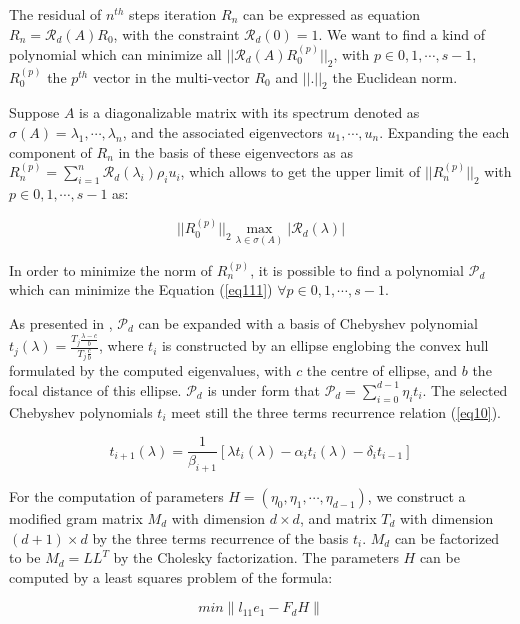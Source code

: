 The residual of \(n^{th}\) steps iteration \(R_n\) can be expressed as equation $R_n=\mathcal{R}_d(A)R_0$, with the constraint \(\mathcal{R}_d(0)=1\). We want to find a kind of polynomial which can minimize all \(||\mathcal{R}_d(A)R_0^{(p)}||_2\), with $p \in 0,1,\cdots,s-1$, $R_0^{(p)}$ the $p^{th}$ vector in the multi-vector $R_0$ and \(||.||_2\) the Euclidean norm.

Suppose $A$ is a diagonalizable matrix with its spectrum denoted as \(\sigma(A)=\lambda_1, \cdots, \lambda_n\), and the associated eigenvectors \(u_1, \cdots, u_n\). Expanding the each component of \(R_n\) in the basis of these eigenvectors as as $R_n^{(p)}=\sum_{i=1}^{n}\mathcal{R}_d(\lambda_i)\rho_i u_i$, which allows to get the upper limit of $||R_n^{(p)}||_2$ with $p \in 0,1,\cdots,s-1$ as:

\begin{equation}
\label{eq111}
||R_0^{(p)}||_2 \max_{\lambda \in \sigma(A)}|\mathcal{R}_d(\lambda)|
\end{equation}

In order to minimize the norm of $R_n^{(p)}$, it is possible to find a polynomial $\mathcal{P}_d$ which can minimize the Equation (\ref{eq111}) $\forall p \in 0,1,\cdots,s-1$.

As presented in \cite{wu2018distributed}, $\mathcal{P}_d$ can be expanded with a basis of Chebyshev polynomial $t_j(\lambda)=\frac{T_j \frac{\lambda-c}{b}}{T_j \frac{c}{b}}$, where $t_i$ is constructed by an ellipse englobing the convex hull formulated by the computed eigenvalues, with $c$ the centre of ellipse, and $b$ the focal distance of this ellipse. $\mathcal{P}_d$ is under form that $\mathcal{P}_d=\sum_{i=0}^{d-1}\eta_it_i$. The selected Chebyshev polynomials \(t_i\) meet still the three terms recurrence relation (\ref{eq10}). 

\begin{equation}
\label{eq10}
t_{i+1}(\lambda)=\frac{1}{\beta_{i+1}}[\lambda t_i(\lambda)-\alpha_i t_i(\lambda)-\delta_i t_{i-1}]
\end{equation}


For the computation of parameters $H=(\eta_0,\eta_1,\cdots,\eta_{d-1})$, we construct a modified gram matrix $M_d$ with dimension $d \times d$, and matrix $T_d$ with dimension $(d+1) \times d$ by the three terms recurrence of the basis $t_i$. $M_d$ can be factorized to be $M_d=LL^T$ by the Cholesky factorization. The parameters $H$ can be computed by a least squares problem of the formula:


\begin{equation}
\label{eq112}
min \|l_{11}e_1-F_d H\|
\end{equation}


